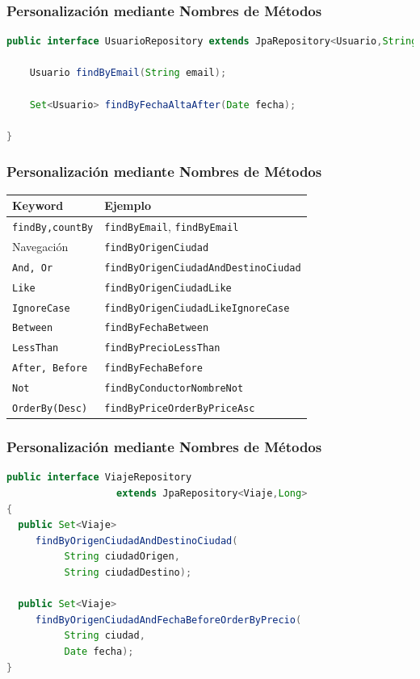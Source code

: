 \documentclass[a4paper,slidestop,xcolor=pst,blue]{beamer}
\newcommand{\ann}[1]{\color{blue}\texttt{#1}\color{black}}
\begin{document}
\begin{frame}[c,fragile]
    \frametitle{Personalización mediante Nombres de Métodos}
\begin{lstlisting}[basicstyle=\footnotesize,language=Java]
public interface UsuarioRepository extends JpaRepository<Usuario,String> {
	
	Usuario findByEmail(String email);
	
	Set<Usuario> findByFechaAltaAfter(Date fecha);

}
\end{lstlisting}
\end{frame}

\begin{frame}[c,fragile]
    \frametitle{Personalización mediante Nombres de Métodos}
    \begin{center}
    \begin{tabular}{l|l}
    Keyword              & Ejemplo                                     \\ \hline
    \ann{findBy,countBy} & \texttt{findByEmail}, \texttt{findByEmail}  \\
    Navegación           & \texttt{findByOrigenCiudad}                 \\
    \ann{And, Or}        & \texttt{findByOrigenCiudadAndDestinoCiudad} \\
    \ann{Like}           & \texttt{findByOrigenCiudadLike}             \\
    \ann{IgnoreCase}     & \texttt{findByOrigenCiudadLikeIgnoreCase}   \\
    \ann{Between}        & \texttt{findByFechaBetween}           \\
    \ann{LessThan}       & \texttt{findByPrecioLessThan}         \\
    \ann{After, Before}  & \texttt{findByFechaBefore}            \\
    \ann{Not}            & \texttt{findByConductorNombreNot}     \\
    \ann{OrderBy(Desc)}  & \texttt{findByPriceOrderByPriceAsc}   \\
    \end{tabular}
    \end{center}
\end{frame}

\begin{frame}[c,fragile]
    \frametitle{Personalización mediante Nombres de Métodos}
\begin{lstlisting}[basicstyle=\footnotesize,language=Java]
public interface ViajeRepository
                   extends JpaRepository<Viaje,Long>
{
  public Set<Viaje>
     findByOrigenCiudadAndDestinoCiudad(
          String ciudadOrigen,
          String ciudadDestino);
	
  public Set<Viaje>
     findByOrigenCiudadAndFechaBeforeOrderByPrecio(
          String ciudad,
          Date fecha);
}
\end{lstlisting}
\end{frame}
\end{document}
